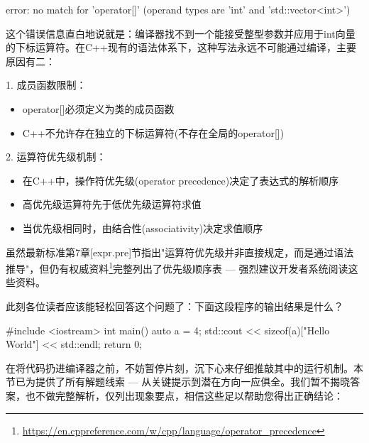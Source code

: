 \begin{shell}
error: no match for 'operator[]' (operand types are 'int' and 'std::vector<int>')
\end{shell}

这个错误信息直白地说就是：编译器找不到一个能接受整型参数并应用于int向量的下标运算符。在C++现有的语法体系下，这种写法永远不可能通过编译，主要原因有二：

1. 成员函数限制：

\begin{itemize}
\item 
operator[]必须定义为类的成员函数

\item 
C++不允许存在独立的下标运算符(不存在全局的operator[])
\end{itemize}

2. 运算符优先级机制：

\begin{itemize}
\item 
在C++中，操作符优先级(operator precedence)决定了表达式的解析顺序

\item 
高优先级运算符先于低优先级运算符求值

\item 
当优先级相同时，由结合性(associativity)决定求值顺序
\end{itemize}

虽然最新标准第7章[expr.pre]节指出"运算符优先级并非直接规定，而是通过语法推导"，但仍有权威资料\footnote{\url{https://en.cppreference.com/w/cpp/language/operator_precedence}}完整列出了优先级顺序表 --- 强烈建议开发者系统阅读这些资料。


此刻各位读者应该能轻松回答这个问题了：下面这段程序的输出结果是什么？

\begin{cpp}
#include <iostream>
int main() {
  auto a = 4;
  std::cout << sizeof(a)["Hello World"] << std::endl;
  return 0;
}
\end{cpp}

在将代码扔进编译器之前，不妨暂停片刻，沉下心来仔细推敲其中的运行机制。本节已为提供了所有解题线索 --- 从关键提示到潜在方向一应俱全。我们暂不揭晓答案，也不做完整解析，仅列出现象要点，相信这些足以帮助您得出正确结论：

